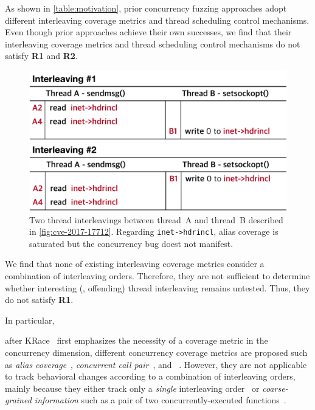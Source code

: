 As shown in \autoref{table:motivation}, prior concurrency fuzzing
approaches adopt different interleaving coverage metrics and thread
scheduling control mechanisms.
%
Even though prior approaches achieve their own successes, we find that
their interleaving coverage metrics and thread scheduling control
mechanisms do not satisfy \textbf{R1} and \textbf{R2}.


%
\begin{figure}[t]
  \centering
  \includegraphics[width=0.95\linewidth]{fig/alias-coverage.pdf}
  \caption{Two thread interleavings between thread~A and thread~B
    described in \autoref{fig:cve-2017-17712}. Regarding
    \texttt{inet->hdrincl}, alias coverage is saturated but the
    concurrency bug doest not manifest.}
  \label{fig:alias-coverage}
\end{figure}
%
We find that none of existing interleaving coverage metrics consider
a combination of interleaving orders.
%
Therefore, they are not sufficient to determine whether interesting
(\ie, offending) thread interleaving remains untested. Thus, they do
not satisfy \textbf{R1}.


In particular,


after KRace~\cite{krace} first emphasizes the necessity
of a coverage metric in the concurrency dimension, different
concurrency coverage metrics are proposed such as \textit{alias
  coverage}~\cite{krace}, \textit{concurrent call
  pair}~\cite{conzzer}, and \textit{}~\cite{muzz}.
%
However, they are not applicable to track behavioral changes according
to a combination of interleaving orders, mainly because they either
track only a \textit{single} interleaving order~\cite{krace, muzz} or
\textit{coarse-grained information} such as a pair of two
concurrently-executed functions~\cite{conzzer}.

